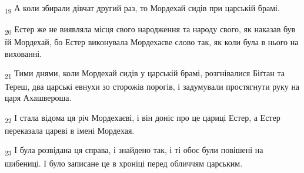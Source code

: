 \begin{tcolorbox}
\textsubscript{19} А коли збирали дівчат другий раз, то Мордехай сидів при царській брамі.
\end{tcolorbox}
\begin{tcolorbox}
\textsubscript{20} Естер же не виявляла місця свого народження та народу свого, як наказав був їй Мордехай, бо Естер виконувала Мордехаєве слово так, як коли була в нього на вихованні.
\end{tcolorbox}
\begin{tcolorbox}
\textsubscript{21} Тими днями, коли Мордехай сидів у царській брамі, розгнівалися Біґтан та Тереш, два царські евнухи зо сторожів порогів, і задумували простягнути руку на царя Ахашвероша.
\end{tcolorbox}
\begin{tcolorbox}
\textsubscript{22} І стала відома ця річ Мордехаєві, і він доніс про це цариці Естер, а Естер переказала цареві в імені Мордехая.
\end{tcolorbox}
\begin{tcolorbox}
\textsubscript{23} І була розвідана ця справа, і знайдено так, і ті обоє були повішені на шибениці. І було записане це в хроніці перед обличчям царським.
\end{tcolorbox}
